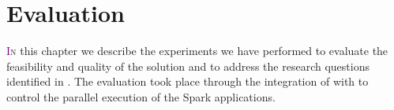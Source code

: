 \chapter{Evaluation} \label{chap:Evaluation}

\lettrine[lines=4]{\textcolor{purple}{I}}{n} this chapter we describe the experiments we have performed to evaluate the feasibility and quality of the solution and to address the research questions identified in .
The evaluation took place through the integration of \dSymb with \cSpark to control the parallel execution of the Spark applications.


